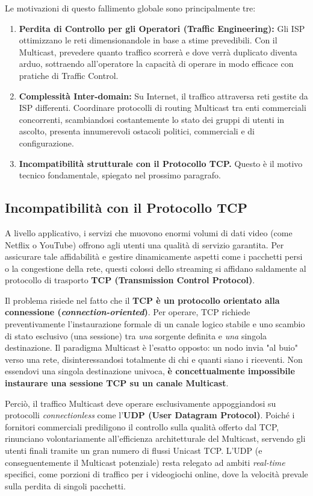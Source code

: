 Le motivazioni di questo fallimento globale sono principalmente tre:
\begin{enumerate}
    \item \textbf{Perdita di Controllo per gli Operatori (Traffic Engineering):} Gli ISP ottimizzano le reti dimensionandole in base a stime prevedibili. Con il Multicast, prevedere quanto traffico scorrerà e dove verrà duplicato diventa arduo, sottraendo all'operatore la capacità di operare in modo efficace con pratiche di Traffic Control.
    \item \textbf{Complessità Inter-domain:} Su Internet, il traffico attraversa reti gestite da ISP differenti. Coordinare protocolli di routing Multicast tra enti commerciali concorrenti, scambiandosi costantemente lo stato dei gruppi di utenti in ascolto, presenta innumerevoli ostacoli politici, commerciali e di configurazione.
    \item \textbf{Incompatibilità strutturale con il Protocollo TCP.} Questo è il motivo tecnico fondamentale, spiegato nel prossimo paragrafo.
\end{enumerate}

\subsection{Incompatibilità con il Protocollo TCP}
A livello applicativo, i servizi che muovono enormi volumi di dati video (come Netflix o YouTube) offrono agli utenti una qualità di servizio garantita. Per assicurare tale affidabilità e gestire dinamicamente aspetti come i pacchetti persi o la congestione della rete, questi colossi dello streaming si affidano saldamente al protocollo di trasporto \textbf{TCP (Transmission Control Protocol)}.

Il problema risiede nel fatto che il \textbf{TCP è un protocollo orientato alla connessione (\textit{connection-oriented})}. Per operare, TCP richiede preventivamente l'instaurazione formale di un canale logico stabile e uno scambio di stato esclusivo (una sessione) tra \textit{una} sorgente definita e \textit{una} singola destinazione.
Il paradigma Multicast è l'esatto opposto: un nodo invia "al buio" verso una rete, disinteressandosi totalmente di chi e quanti siano i riceventi. Non essendovi una singola destinazione univoca, \textbf{è concettualmente impossibile instaurare una sessione TCP su un canale Multicast}.

Perciò, il traffico Multicast deve operare esclusivamente appoggiandosi su protocolli \textit{connectionless} come l'\textbf{UDP (User Datagram Protocol)}. Poiché i fornitori commerciali prediligono il controllo sulla qualità offerto dal TCP, rinunciano volontariamente all'efficienza architetturale del Multicast, servendo gli utenti finali tramite un gran numero di flussi Unicast TCP. L'UDP (e conseguentemente il Multicast potenziale) resta relegato ad ambiti \textit{real-time} specifici, come porzioni di traffico per i videogiochi online, dove la velocità prevale sulla perdita di singoli pacchetti.